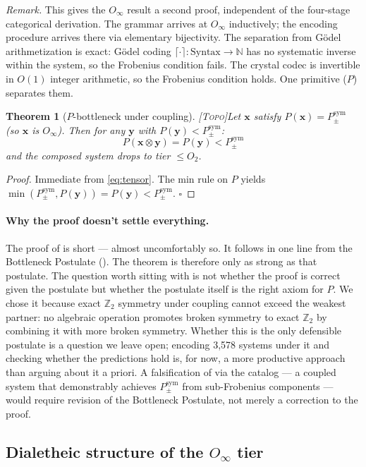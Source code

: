 \documentclass[12pt,a4paper]{article}
\newtheorem{theorem}{Theorem}
\newcommand{\xvec}{\mathbf{x}}
\newcommand{\yvec}{\mathbf{y}}
\newcommand{\Ppms}{P_{\pm}^{\text{sym}}}
\newcommand{\Oinf}{O_\infty}
\newcommand{\Otwo}{O_2}
\newcommand{\tensor}{\otimes}
\newcommand{\TOPO}{\textsc{[Topo]}}
\begin{document}
\noindent\textit{Remark.} This gives the $\Oinf$ result a second proof,
independent of the four-stage categorical derivation. The grammar arrives at
$\Oinf$ inductively; the encoding procedure arrives there via elementary
bijectivity. The separation from G\"{o}del arithmetization is exact: G\"{o}del
coding $\lceil\cdot\rceil: \text{Syntax} \to \mathbb{N}$ has no systematic
inverse within the system, so the Frobenius condition fails. The crystal codec
is invertible in $O(1)$ integer arithmetic, so the Frobenius condition holds.
One primitive ($P$) separates them.

\begin{theorem}[$P$-bottleneck under coupling]
\label{thm:bottleneck}
\TOPO\quad Let $\xvec$ satisfy $P(\xvec) = \Ppms$ (so $\xvec$ is
$\Oinf$). Then for any $\yvec$ with $P(\yvec) < \Ppms$:
\[
  P(\xvec \tensor \yvec) = P(\yvec) < \Ppms
\]
and the composed system drops to tier $\leq \Otwo$.
\end{theorem}

\begin{proof}
Immediate from \eqref{eq:tensor}. The min rule on $P$ yields
$\min(\Ppms, P(\yvec)) = P(\yvec) < \Ppms$. \quad$\square$
\end{proof}

\paragraph{Why the proof doesn't settle everything.}
The proof of  is short --- almost uncomfortably
so. It follows in one line from the Bottleneck Postulate
(). The theorem is therefore only as strong as
that postulate. The question worth sitting with is not whether the
proof is correct given the postulate but whether the postulate itself
is the right axiom for $P$. We chose it because exact $\mathbb{Z}_2$
symmetry under coupling cannot exceed the weakest partner: no algebraic
operation promotes broken symmetry to exact $\mathbb{Z}_2$ by
combining it with more broken symmetry. Whether this is the only
defensible postulate is a question we leave open; encoding 3,578
systems under it and checking whether the predictions hold is, for
now, a more productive approach than arguing about it a priori.
A falsification of  via the catalog --- a coupled
system that demonstrably achieves $\Ppms$ from sub-Frobenius components
--- would require revision of the Bottleneck Postulate, not merely a
correction to the proof.

\subsection{Dialetheic structure of the $\Oinf$ tier}
\label{sec:dialetheia}
\end{document}
